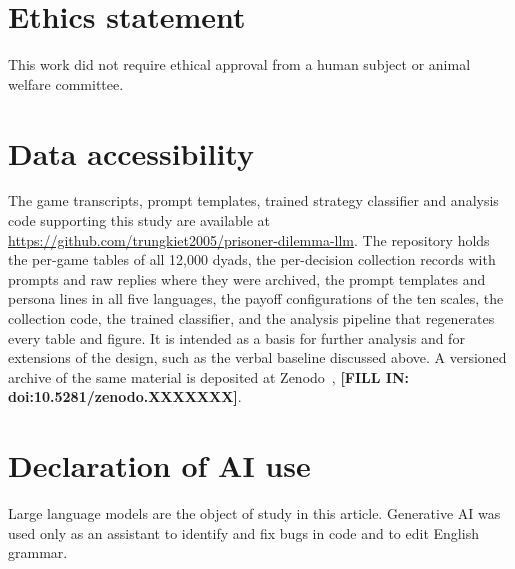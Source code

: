 \documentclass[11pt,a4paper]{article}
\newcommand{\rev}[1]{{\color{red}#1}}
\newcommand{\rev}[1]{#1}
\newcommand{\fillin}[1]{\textbf{[FILL IN: #1]}}
\begin{document}



\section*{Ethics statement}
This work did not require ethical approval from a human subject or animal welfare committee.

\section*{Data accessibility}
The game transcripts, prompt templates, trained strategy classifier and analysis code supporting this study are available at
\url{https://github.com/trungkiet2005/prisoner-dilemma-llm}. \rev{The repository
holds the per-game tables of all 12{,}000 dyads, the per-decision collection
records with prompts and raw replies where they were archived, the prompt
templates and persona lines in all five languages, the payoff configurations
of the ten scales, the collection code, the trained classifier, and the
analysis pipeline that regenerates every table and figure. It is intended as
a basis for further analysis and for extensions of the design, such as the
verbal baseline discussed above. A versioned archive of
the same material is deposited at Zenodo~\cite{han2026data},
\fillin{doi:10.5281/zenodo.XXXXXXX}.}

\section*{Declaration of AI use}
Large language models are the object of study in this article. Generative AI was used only as an assistant to identify and fix bugs in code and to edit English grammar.
\end{document}
